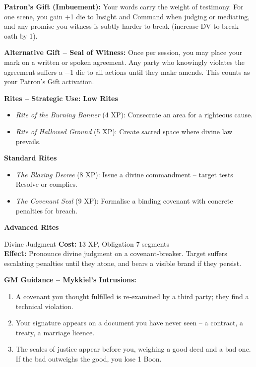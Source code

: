 \documentclass[10pt,a5paper]{book}
\begin{document}
\textbf{Patron's Gift (Imbuement):} Your words carry the weight of testimony. For one scene, you gain +1 die to Insight and Command when judging or mediating, and any promise you witness is subtly harder to break (increase DV to break oath by 1).

\textbf{Alternative Gift -- Seal of Witness:} Once per session, you may place your mark on a written or spoken agreement. Any party who knowingly violates the agreement suffers a −1 die to all actions until they make amends. This counts as your Patron's Gift activation.

\textbf{Rites -- Strategic Use:}
\textbf{Low Rites}
\begin{itemize}
    \item \textit{Rite of the Burning Banner} (4 XP): Consecrate an area for a righteous cause.
    \item \textit{Rite of Hallowed Ground} (5 XP): Create sacred space where divine law prevails.
\end{itemize}
\textbf{Standard Rites}
\begin{itemize}
    \item \textit{The Blazing Decree} (8 XP): Issue a divine commandment -- target tests Resolve or complies.
    \item \textit{The Covenant Seal} (9 XP): Formalise a binding covenant with concrete penalties for breach.
\end{itemize}
\textbf{Advanced Rites}
\begin{patronbox}{Divine Judgment}
\textbf{Cost:} 13 XP, Obligation 7 segments \\
\textbf{Effect:} Pronounce divine judgment on a covenant‑breaker. Target suffers escalating penalties until they atone, and bears a visible brand if they persist.
\end{patronbox}

\textbf{GM Guidance -- Mykkiel's Intrusions:}
\begin{enumerate}
    \item A covenant you thought fulfilled is re‑examined by a third party; they find a technical violation.
    \item Your signature appears on a document you have never seen -- a contract, a treaty, a marriage licence.
    \item The scales of justice appear before you, weighing a good deed and a bad one. If the bad outweighs the good, you lose 1 Boon.
\end{enumerate}

\clearpage
\end{document}
